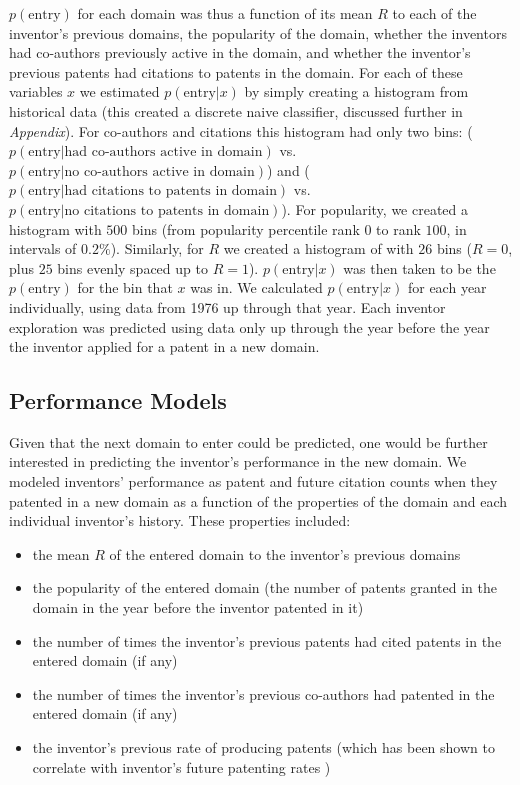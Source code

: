 \documentclass{dsj}
\begin{document}
$p(\text{entry})$ for each domain was thus a function of its mean $R$ to each of the inventor's previous domains, the popularity of the domain, whether the inventors had co-authors previously active in the domain, and whether the inventor's previous patents had citations to patents in the domain. For each of these variables $x$ we estimated $p(\text{entry}|x)$ by simply creating a histogram from historical data (this created a discrete naive classifier, discussed further in \textit{Appendix}). For co-authors and citations this histogram had only two bins: ($p(\text{entry}|\text{had co-authors active in domain})$ vs. $p(\text{entry}|\text{no co-authors active in domain})$) and ($p(\text{entry}|\text{had citations to patents in domain})$ vs. $p(\text{entry}|\text{no citations to patents in domain})$). For popularity, we created a histogram with $500$ bins (from popularity percentile rank $0$ to rank $100$, in intervals of $0.2\%$). Similarly, for $R$ we created a histogram of with $26$ bins ($R=0$, plus $25$ bins evenly spaced up to $R=1$). $p(\text{entry}|x)$ was then taken to be the $p(\text{entry})$ for the bin that $x$ was in. We calculated $p(\text{entry}|x)$ for each year individually, using data from 1976 up through that year. Each inventor exploration was predicted using data only up through the year before the year the inventor applied for a patent in a new domain.

\subsection*{Performance Models}
Given that the next domain to enter could be predicted, one would be further interested in predicting the inventor's performance in the new domain. We modeled inventors' performance as patent and future citation counts when they patented in a new domain as a function of the properties of the domain and each individual inventor's history. These properties included:
\begin{itemize}
    \item the mean $R$ of the entered domain to the inventor's previous domains
    \item the popularity of the entered domain (the number of patents granted in the domain in the year before the inventor patented in it)
    \item the number of times the inventor's previous patents had cited patents in the entered domain (if any)
    \item the number of times the inventor's previous co-authors had patented in the entered domain (if any)
    \item the inventor's previous rate of producing patents (which has been shown to correlate with inventor's future patenting rates \cite{Conti2013})
\end{itemize}
\end{document}
